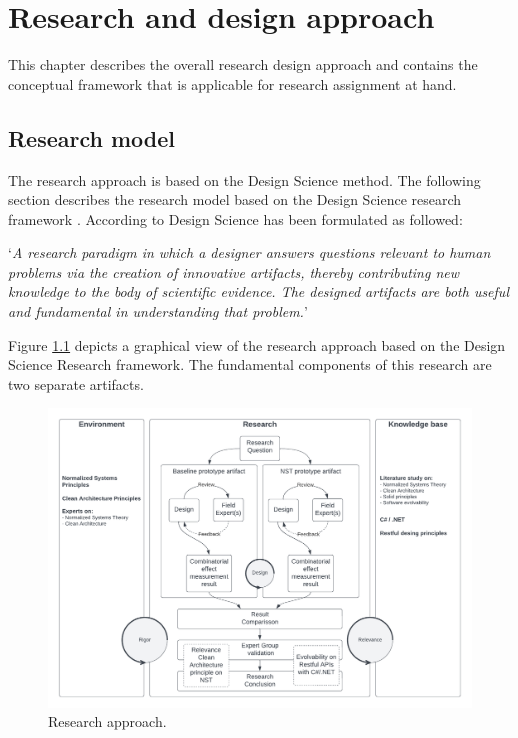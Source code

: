 \chapter{Research and design approach} \label{research_and_design_approach} 



This chapter describes the overall research design approach and contains the conceptual
framework that is applicable for research assignment at hand. 

\section{Research model}
The research approach is based on the Design Science method. The following section
describes the research model based on the Design Science research framework \parencite[(P.
107)]{recker_scientific_2013}. According to \citeauthor{recker_scientific_2013} Design
Science has been formulated as followed:

\begin{center}
    \enquote*{\textit{A research paradigm in which a designer answers questions relevant
    to human problems via the creation of innovative artifacts, thereby contributing new
    knowledge to the body of scientific evidence. The designed artifacts are both useful
    and fundamental in understanding that problem.}}
\end{center}
Figure \ref{fig:reserach_approach} depicts a graphical view of the research approach based
on the Design Science Research framework. The fundamental components of this research are
two separate artifacts. 

\begin{figure}[!h]
    \centering
    \includegraphics[width=1\textwidth]{Figures/research_approach}
    \caption[Research approach]{Research approach.}
    \label{fig:reserach_approach}
\end{figure}

